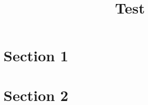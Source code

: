 \documentclass{article}
\begin{document}
\title{Test}
\maketitle

\section{Section 1}
\section{Section 2}
\end{document}

